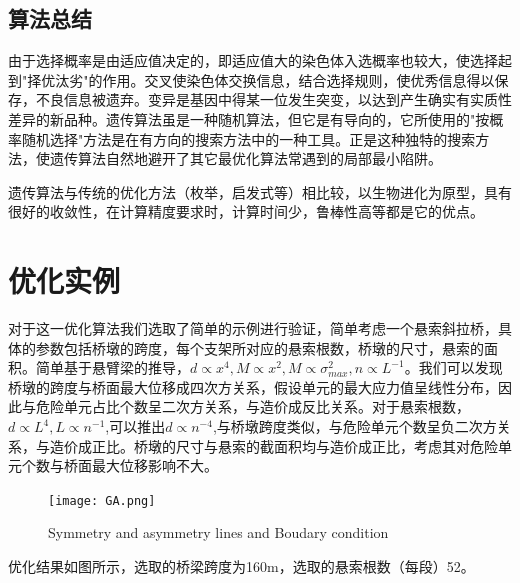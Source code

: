 \documentclass[forprint]{WHUBachelor}
\begin{document}
\subsection{算法总结}
由于选择概率是由适应值决定的，即适应值大的染色体入选概率也较大，使选择起到"择优汰劣"的作用。交叉使染色体交换信息，结合选择规则，使优秀信息得以保存，不良信息被遗弃。变异是基因中得某一位发生突变，以达到产生确实有实质性差异的新品种。遗传算法虽是一种随机算法，但它是有导向的，它所使用的"按概率随机选择"方法是在有方向的搜索方法中的一种工具。正是这种独特的搜索方法，使遗传算法自然地避开了其它最优化算法常遇到的局部最小陷阱。\par
遗传算法与传统的优化方法（枚举，启发式等）相比较，以生物进化为原型，具有很好的收敛性，在计算精度要求时，计算时间少，鲁棒性高等都是它的优点。
\section{优化实例}
对于这一优化算法我们选取了简单的示例进行验证，简单考虑一个悬索斜拉桥，具体的参数包括桥墩的跨度，每个支架所对应的悬索根数，桥墩的尺寸，悬索的面积。简单基于悬臂梁的推导，$d\propto x^4,M\propto x^2,M\propto \sigma_{max}^2,n \propto L^{-1}$。我们可以发现桥墩的跨度与桥面最大位移成四次方关系，假设单元的最大应力值呈线性分布，因此与危险单元占比个数呈二次方关系，与造价成反比关系。对于悬索根数，$d \propto L^4,L \propto n^{-1}$,可以推出$d \propto n^{-4}$,与桥墩跨度类似，与危险单元个数呈负二次方关系，与造价成正比。桥墩的尺寸与悬索的截面积均与造价成正比，考虑其对危险单元个数与桥面最大位移影响不大。
\begin{figure}[H]
\centering
    \texttt{[image: GA.png]}\hfill
  \caption{Symmetry and asymmetry lines and Boudary condition}
\label{fig:1}
\end{figure}
优化结果如图所示，选取的桥梁跨度为160m，选取的悬索根数（每段）52。

%
%
\cleardoublepage
\end{document}
